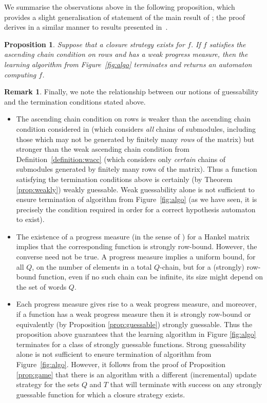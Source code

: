 \documentclass[10pt,a4paper]{amsart}
\newtheorem{prop}[thm]{Proposition}
\theoremstyle{definition}
\newtheorem{rem}[thm]{Remark}
\numberwithin{equation}{section}
\numberwithin{theorem}{section}
\begin{document}
We summarise the observations above in the following proposition, which provides a slight generalisation of statement of the main result of \cite{HKRS20}; the proof derives in a similar manner to results presented in~\cite{HKRS20}.

\begin{prop}\cite[Theorem 14]{HKRS20}
Suppose that a closure strategy exists for $f$. If $f$ satisfies the ascending chain condition on rows and has a weak progress measure, then the learning algorithm from Figure~\ref{fig:algo} terminates and returns an automaton computing $f$.
\end{prop}

\begin{rem}
\label{rem:terminate}
Finally, we note the relationship between our notions of guessability and the termination conditions stated above.
\begin{itemize}
\item The ascending chain condition on rows is weaker than the ascending chain condition considered in \cite{HKRS20} (which considers \emph{all} chains of submodules, including those which may not be generated by finitely many \emph{rows} of the matrix) but stronger than the weak ascending chain condition from Definition~\ref{definition:wacc} (which considers only \emph{certain} chains of submodules generated by finitely many rows of the matrix). Thus a function satisfying the termination conditions above is certainly (by Theorem \ref{prop:weakly})  weakly guessable. Weak guessability alone is not sufficient to ensure termination of algorithm from Figure~\ref{fig:algo} (as we have seen, it is precisely the condition required in order for a correct hypothesis automaton to exist).
\item  The existence of a progress measure (in the sense of \cite{HKRS20}) for a Hankel matrix implies that the corresponding function is strongly row-bound. However, the converse need not be true. A progress measure implies a uniform bound, for all $Q$, on the number of elements in a total $Q$-chain, but for a (strongly) row-bound function, even if no such chain can be infinite, its size might depend on the set of words $Q$. 
\item Each progress measure gives rise to a weak progress measure, and moreover, if a function has a weak progress measure then it is strongly row-bound or equivalently (by Proposition \ref{prop:guessable}) strongly guessable. Thus the proposition above guarantees that the learning algorithm in Figure \ref{fig:algo} terminates for a class of strongly guessable functions. Strong guessability alone is not sufficient to ensure termination of algorithm from Figure~\ref{fig:algo}. However, it follows from the proof of Proposition  \ref{prop:game} that there is an algorithm with a different (incremental) update strategy for the sets $Q$ and $T$ that will terminate with success on any strongly guessable function for which a closure strategy exists.
\end{itemize}
\end{rem}
\end{document}
